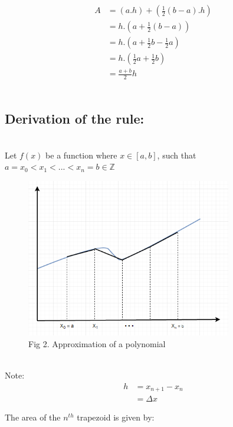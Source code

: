 \documentclass[11pt]{article}
\begin{document}
\begin{page}
\begin{equation}
\begin{aligned}
    A &= (a . h) + (\frac{1}{2}(b - a).h)\\
    & = h.(a + \frac{1}{2}(b - a))\\
    & = h.(a + \frac{1}{2}b - \frac{1}{2}a)\\
    & = h.(\frac{1}{2}a + \frac{1}{2}b)\\
    & = \frac{a+b}{2}h
\end{aligned}
\end{equation}
\\
\subsection{Derivation of the rule:}\\
\noindent Let $f(x)$ be a function where $x \in [a,b]$, such that\\
 $a = x_0 < x_1 < ... < x_n = b \in \mathbb{Z}$
 
\begin{figure}[ht]
\centering
     \includegraphics[width=0.80\textwidth]{approx_graph}\\
     Fig 2. Approximation of a polynomial
\end{figure}
\\
\noindent Note: \\
\begin{equation}
\begin{aligned}
    h &= x_{n+1} - x_n\\
    &= \Delta{}x
\end{aligned}
\end{equation}

\noindent The area of the $n^{th}$ trapezoid is given by:\\


\end{page}
\end{document}
